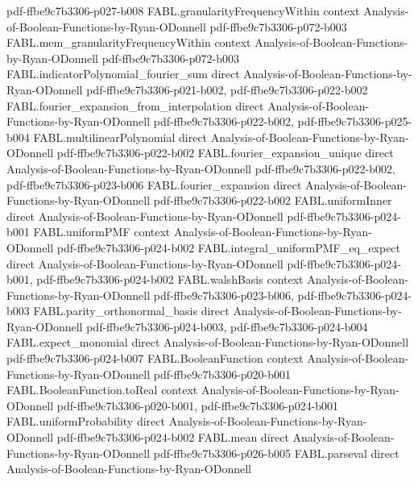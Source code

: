 \begin{theorem}
  {pdf-ffbe9c7b3306-p027-b008}
\proofstep
  {FABL.granularityFrequencyWithin}
  {context}
  {Analysis-of-Boolean-Functions-by-Ryan-ODonnell}
  {pdf-ffbe9c7b3306-p072-b003}
\proofstep
  {FABL.mem_granularityFrequencyWithin}
  {context}
  {Analysis-of-Boolean-Functions-by-Ryan-ODonnell}
  {pdf-ffbe9c7b3306-p072-b003}
\proofstep
  {FABL.indicatorPolynomial_fourier_sum}
  {direct}
  {Analysis-of-Boolean-Functions-by-Ryan-ODonnell}
  {pdf-ffbe9c7b3306-p021-b002,
    pdf-ffbe9c7b3306-p022-b002}
\proofstep
  {FABL.fourier_expansion_from_interpolation}
  {direct}
  {Analysis-of-Boolean-Functions-by-Ryan-ODonnell}
  {pdf-ffbe9c7b3306-p022-b002,
    pdf-ffbe9c7b3306-p025-b004}
\proofstep
  {FABL.multilinearPolynomial}
  {direct}
  {Analysis-of-Boolean-Functions-by-Ryan-ODonnell}
  {pdf-ffbe9c7b3306-p022-b002}
\proofstep
  {FABL.fourier_expansion_unique}
  {direct}
  {Analysis-of-Boolean-Functions-by-Ryan-ODonnell}
  {pdf-ffbe9c7b3306-p022-b002,
    pdf-ffbe9c7b3306-p023-b006}
\proofstep
  {FABL.fourier_expansion}
  {direct}
  {Analysis-of-Boolean-Functions-by-Ryan-ODonnell}
  {pdf-ffbe9c7b3306-p022-b002}
\proofstep
  {FABL.uniformInner}
  {direct}
  {Analysis-of-Boolean-Functions-by-Ryan-ODonnell}
  {pdf-ffbe9c7b3306-p024-b001}
\proofstep
  {FABL.uniformPMF}
  {context}
  {Analysis-of-Boolean-Functions-by-Ryan-ODonnell}
  {pdf-ffbe9c7b3306-p024-b002}
\proofstep
  {FABL.integral_uniformPMF_eq_expect}
  {direct}
  {Analysis-of-Boolean-Functions-by-Ryan-ODonnell}
  {pdf-ffbe9c7b3306-p024-b001,
    pdf-ffbe9c7b3306-p024-b002}
\proofstep
  {FABL.walshBasis}
  {context}
  {Analysis-of-Boolean-Functions-by-Ryan-ODonnell}
  {pdf-ffbe9c7b3306-p023-b006,
    pdf-ffbe9c7b3306-p024-b003}
\proofstep
  {FABL.parity_orthonormal_basis}
  {direct}
  {Analysis-of-Boolean-Functions-by-Ryan-ODonnell}
  {pdf-ffbe9c7b3306-p024-b003,
    pdf-ffbe9c7b3306-p024-b004}
\proofstep
  {FABL.expect_monomial}
  {direct}
  {Analysis-of-Boolean-Functions-by-Ryan-ODonnell}
  {pdf-ffbe9c7b3306-p024-b007}
\proofstep
  {FABL.BooleanFunction}
  {context}
  {Analysis-of-Boolean-Functions-by-Ryan-ODonnell}
  {pdf-ffbe9c7b3306-p020-b001}
\proofstep
  {FABL.BooleanFunction.toReal}
  {context}
  {Analysis-of-Boolean-Functions-by-Ryan-ODonnell}
  {pdf-ffbe9c7b3306-p020-b001,
    pdf-ffbe9c7b3306-p024-b001}
\proofstep
  {FABL.uniformProbability}
  {direct}
  {Analysis-of-Boolean-Functions-by-Ryan-ODonnell}
  {pdf-ffbe9c7b3306-p024-b002}
\proofstep
  {FABL.mean}
  {direct}
  {Analysis-of-Boolean-Functions-by-Ryan-ODonnell}
  {pdf-ffbe9c7b3306-p026-b005}
\proofstep
  {FABL.parseval}
  {direct}
  {Analysis-of-Boolean-Functions-by-Ryan-ODonnell}

\end{theorem}
